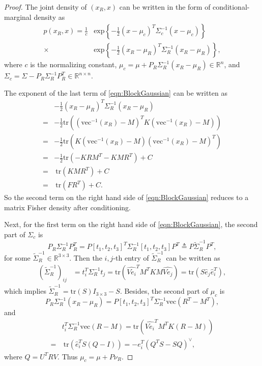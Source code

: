 \documentclass[10pt,twocolumn]{article}
\newcommand{\tr}[1]{\ensuremath{\mathrm{tr}\left( #1 \right)}}
\newcommand{\real}[1]{\ensuremath{\mathbb{R}^{ #1 }}}
\begin{document}
\begin{proof}
	The joint density of $(x_R,x)$ can be written in the form of conditional-marginal density as
	\begin{align} \label{eqn:BlockGaussian}
		p(x_R,x) = \frac{1}{c}&\mathrm{exp}\left\{-\frac{1}{2}(x-{\mu}_c)^T{\Sigma}_c^{-1}(x-{\mu}_c)\right\} \nonumber \\
		\times &\mathrm{exp}\left\{-\frac{1}{2}(x_R-{\mu}_R)^T\Sigma_R^{-1}(x_R-{\mu}_R)\right\},
	\end{align}
	where $c$ is the normalizing constant,  ${\mu}_c = {\mu}+P_R\Sigma_R^{-1}(x_R-{\mu}_R)\in\real{n}$, and ${\Sigma}_c = {\Sigma}-P_R\Sigma_R^{-1}P_R^T\in\real{n\times n}$.
	
	The exponent of the last term of \eqref{eqn:BlockGaussian} can be written as
	\begin{align*}
		&-\frac{1}{2}(x_R-\mu_R)^T\Sigma_R^{-1}(x_R-\mu_R) \\
		= &-\frac{1}{2}\tr{(\mathrm{vec}^{-1}(x_R)-M)^TK(\mathrm{vec}^{-1}(x_R)-M)} \\
		= &-\frac{1}{2}\tr{K(\mathrm{vec}^{-1}(x_R)-M)(\mathrm{vec}^{-1}(x_R)-M)^T} \\
		= &-\frac{1}{2}\tr{-KRM^T-KMR^T} + C \\
		= &\ \tr{KMR^T} + C \\
		= &\ \tr{FR^T} + C.
	\end{align*}
	So the second term on the right hand side of \eqref{eqn:BlockGaussian} reduces to a matrix Fisher density after conditioning.
	
	Next, for the first term on the right hand side of \eqref{eqn:BlockGaussian}, the second part of $\Sigma_c$ is
	\begin{equation*}
		P_R\Sigma_R^{-1}P_R^T = {P}[{t}_1,{t}_2,{t}_3]^T\Sigma_R^{-1}[{t}_1,{t}_2,{t}_3]{P}^T 
		\triangleq {P} \tilde{\Sigma}_R^{-1} {P}^T,
	\end{equation*}
	for some $\tilde{\Sigma}_R^{-1} \in \real{3 \times 3}$.
	Then the $i,j$-th entry of $\tilde{\Sigma}_R^{-1}$ can be written as
	\begin{align*}
		(\tilde{\Sigma}_R^{-1})_{ij} &= t_i^T\Sigma_R^{-1}t_j = \tr{\widehat{Ve_i}^TM^TKM\widehat{Ve_j}} = \tr{S\hat{e}_j\hat{e}_i^T},
	\end{align*}
	which implies $\tilde{\Sigma}_R^{-1} = \tr{S}I_{3 \times 3}-S$.
	Besides, the second part of $\mu_c$ is
	\begin{equation*}
		P_R\Sigma_R^{-1}(x_R-{\mu}_R) = {P}[{t}_1,{t}_2,{t}_3]^T\Sigma_R^{-1}\mathrm{vec}(R^T-M^T),
	\end{equation*}
	and
	\begin{align*}
		&t_i^T\Sigma_R^{-1} \mathrm{vec}(R-M)
		= \tr{\widehat{Ve_i}^TM^TK(R-M)} \\
		= &\ \tr{\hat{e}_i^TS(Q-I)} = -e_i^T(Q^TS-SQ)^\vee, 
	\end{align*}
	where ${Q} = U^TRV$.
	Thus $\mu_c = \mu+P\nu_R$.
\end{proof}
\end{document}
